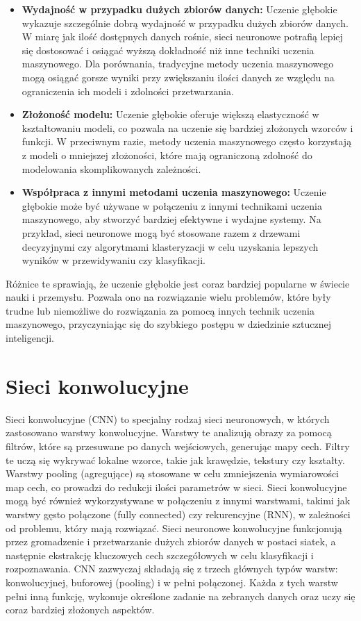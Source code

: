 \begin{itemize}
\item \textbf{Wydajność w przypadku dużych zbiorów danych:} Uczenie głębokie wykazuje szczególnie dobrą wydajność w przypadku dużych zbiorów danych. W miarę jak ilość dostępnych danych rośnie, sieci neuronowe potrafią lepiej się dostosować i osiągać wyższą dokładność niż inne techniki uczenia maszynowego. Dla porównania, tradycyjne metody uczenia maszynowego mogą osiągać gorsze wyniki przy zwiększaniu ilości danych ze względu na ograniczenia ich modeli i zdolności przetwarzania.

\item \textbf{Złożoność modelu:} Uczenie głębokie oferuje większą elastyczność w kształtowaniu modeli, co pozwala na uczenie się bardziej złożonych wzorców i funkcji. W przeciwnym razie, metody uczenia maszynowego często korzystają z modeli o mniejszej złożoności, które mają ograniczoną zdolność do modelowania skomplikowanych zależności.

\item \textbf{Współpraca z innymi metodami uczenia maszynowego:} Uczenie głębokie może być używane w połączeniu z innymi technikami uczenia maszynowego, aby stworzyć bardziej efektywne i wydajne systemy. Na przykład, sieci neuronowe mogą być stosowane razem z drzewami decyzyjnymi czy algorytmami klasteryzacji w celu uzyskania lepszych wyników w przewidywaniu czy klasyfikacji.

\end{itemize}

Różnice te sprawiają, że uczenie głębokie jest coraz bardziej popularne w świecie nauki i przemysłu. Pozwala ono na rozwiązanie wielu problemów, które były trudne lub niemożliwe do rozwiązania za pomocą innych technik uczenia maszynowego, przyczyniając się do szybkiego postępu w dziedzinie sztucznej inteligencji.

\section{Sieci konwolucyjne}
Sieci konwolucyjne (CNN) to specjalny rodzaj sieci neuronowych, w których zastosowano warstwy konwolucyjne. Warstwy te analizują obrazy za pomocą filtrów, które są przesuwane po danych wejściowych, generując mapy cech. Filtry te uczą się wykrywać lokalne wzorce, takie jak krawędzie, tekstury czy kształty. Warstwy pooling (agregujące) są stosowane w celu zmniejszenia wymiarowości map cech, co prowadzi do redukcji ilości parametrów w sieci. Sieci konwolucyjne mogą być również wykorzystywane w połączeniu z innymi warstwami, takimi jak warstwy gęsto połączone (fully connected) czy rekurencyjne (RNN), w zależności od problemu, który mają rozwiązać. Sieci neuronowe konwolucyjne funkcjonują przez gromadzenie i przetwarzanie dużych zbiorów danych w postaci siatek, a następnie ekstrakcję kluczowych cech szczegółowych w celu klasyfikacji i rozpoznawania. CNN zazwyczaj składają się z trzech głównych typów warstw: konwolucyjnej, buforowej (pooling) i w pełni połączonej. Każda z tych warstw pełni inną funkcję, wykonuje określone zadanie na zebranych danych oraz uczy się coraz bardziej złożonych aspektów.


